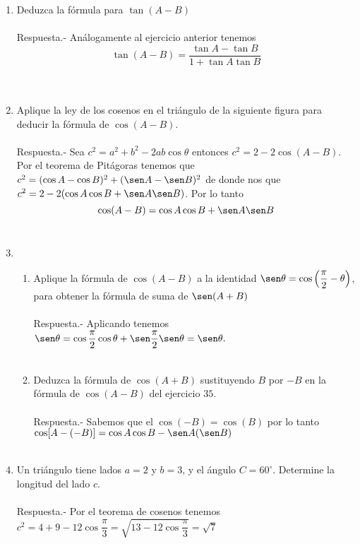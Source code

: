\begin{enumerate}
\item Deduzca la fórmula para $\tan (A-B)$\\\\
    Respuesta.-\; Análogamente al ejercicio anterior tenemos $$\tan(A-B) = \dfrac{\tan A - \tan B}{1 + \tan A \tan B}$$\\\\

\item Aplique la ley de los cosenos en el triángulo de la siguiente figura para deducir la fórmula de $\cos (A - B)$.\\\\
    Respuesta.-\; Sea $c^2=a^2 + b^2 - 2ab\cos \theta$ entonces $c^2 = 2 - 2\cos(A-B)$. Por el teorema de Pitágoras tenemos que $c^2 = (\cos A - \cos B)^2 + (\sen A - \sen B)^2$ de donde nos que $c^2 = 2 - 2(\cos A \cos B + \sen A \sen B)$. Por lo tanto $$\cos (A-B) = \cos A \cos B + \sen A \sen B$$\\

\item 
    \begin{enumerate}[\bfseries a)]
	
	\item Aplique la fórmula de $\cos (A-B)$ a la identidad $\sen \theta = \cos \left(\dfrac{\pi}{2} - \theta\right)$, para obtener la fórmula de suma de $\sen (A+B)$\\\\
	    Respuesta.-\; Aplicando tenemos $\sen \theta = \cos \dfrac{\pi}{2}\cos \theta + \sen\dfrac{\pi}{2} \sen\theta=\sen \theta.$\\\\

	\item Deduzca la fórmula de $\cos (A+B)$ sustituyendo $B$ por $-B$ en la fórmula de $\cos (A-B)$ del ejercicio $35$.\\\\
	    Respuesta.-\; Sabemos que el $\cos (-B) = \cos (B)$ por lo tanto $\cos[A-(-B)] = \cos A \cos B - \sen A (\sen B)$\\\\ 

    \end{enumerate}

\item Un triángulo tiene lados $a = 2$ y $b = 3$, y el ángulo $C = 60^\circ$. Determine la longitud del lado $c$.\\\\
    Respuesta.-\; Por el teorema de cosenos tenemos $c^2 = 4 + 9 - 12\cos\dfrac{\pi}{3} = \sqrt{13 - 12 \cos\dfrac{\pi}{3}} =  \sqrt{7}$\\\\


\end{enumerate}
